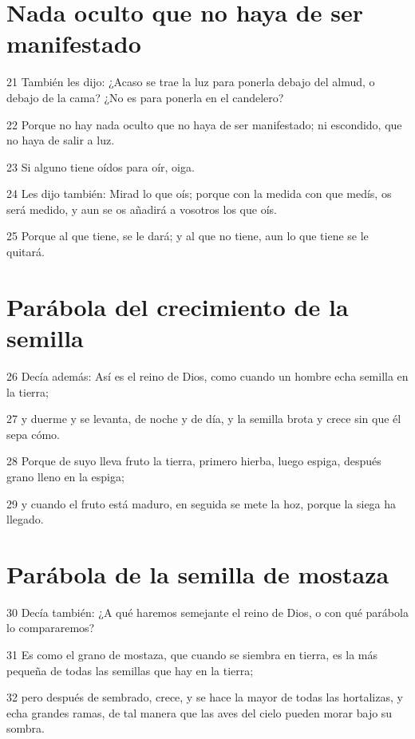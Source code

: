 \section*{Nada oculto que no haya de ser manifestado}

\par 21 También les dijo: ¿Acaso se trae la luz para ponerla debajo del almud, o debajo de la cama? ¿No es para ponerla en el candelero?
\par 22 Porque no hay nada oculto que no haya de ser manifestado; ni escondido, que no haya de salir a luz.
\par 23 Si alguno tiene oídos para oír, oiga.
\par 24 Les dijo también: Mirad lo que oís; porque con la medida con que medís, os será medido, y aun se os añadirá a vosotros los que oís.
\par 25 Porque al que tiene, se le dará; y al que no tiene, aun lo que tiene se le quitará.

\section*{Parábola del crecimiento de la semilla}

\par 26 Decía además: Así es el reino de Dios, como cuando un hombre echa semilla en la tierra;
\par 27 y duerme y se levanta, de noche y de día, y la semilla brota y crece sin que él sepa cómo.
\par 28 Porque de suyo lleva fruto la tierra, primero hierba, luego espiga, después grano lleno en la espiga;
\par 29 y cuando el fruto está maduro, en seguida se mete la hoz, porque la siega ha llegado.

\section*{Parábola de la semilla de mostaza}

\par 30 Decía también: ¿A qué haremos semejante el reino de Dios, o con qué parábola lo compararemos?
\par 31 Es como el grano de mostaza, que cuando se siembra en tierra, es la más pequeña de todas las semillas que hay en la tierra;
\par 32 pero después de sembrado, crece, y se hace la mayor de todas las hortalizas, y echa grandes ramas, de tal manera que las aves del cielo pueden morar bajo su sombra.

